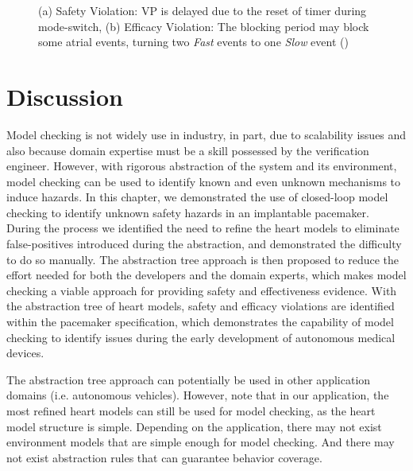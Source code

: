 \begin{figure}
\centering
	\caption{(a) Safety Violation: VP is delayed due to the reset of timer during mode-switch, (b) Efficacy Violation: The blocking period may block some atrial events, turning two \emph{Fast} events to one \emph{Slow} event (\cite{TACAS12})}
\end{figure} 
\vspace{-10pt}
\section{Discussion}
\vspace{-5pt}
Model checking is not widely use in industry, in part, due to scalability issues and also because domain expertise must be a skill possessed by the verification engineer. 
However, with rigorous abstraction of the system and its environment, model checking can be used to identify 
known and even unknown mechanisms to induce hazards. 
In this chapter, we demonstrated the use of closed-loop model checking to identify unknown safety hazards in an implantable pacemaker. 
During the process we identified the need to refine the heart models to eliminate false-positives introduced during the abstraction, and demonstrated the difficulty to do so manually. 
The abstraction tree approach is then proposed to reduce the effort needed for both the developers and the domain experts, which makes model checking a viable approach for providing safety and effectiveness evidence. 
With the abstraction tree of heart models, safety and efficacy violations are identified within the pacemaker specification, which demonstrates the capability of model checking to identify issues during the early development of autonomous medical devices.

The abstraction tree approach can potentially be used in other application domains (i.e. autonomous vehicles). 
However, note that in our application, the most refined heart models can still be used for model checking, as the heart model structure is simple. 
Depending on the application, there may not exist environment models that are simple enough for model checking.
And there may not exist abstraction rules that can guarantee behavior coverage.